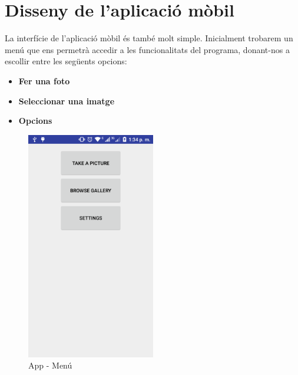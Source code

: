 \section{Disseny de l'aplicació mòbil}
	La interfície de l'aplicació mòbil és també molt simple. Inicialment trobarem un menú que ens permetrà accedir a les funcionalitats del programa, donant-nos a escollir entre les següents opcions:
	\begin{itemize}
		\item{\textbf{Fer una foto}}
		\item{\textbf{Seleccionar una imatge}}
		\item{\textbf{Opcions}}
	\end{itemize}
	\begin{figure}[H]
		\centering
		\includegraphics[width=0.5\textwidth]{images/menu}
		\caption{App - Menú}
	\end{figure}
